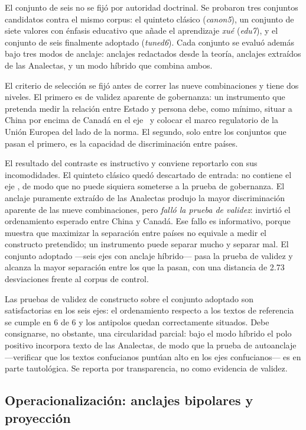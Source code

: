 El conjunto de seis no se fijó por autoridad doctrinal. Se probaron tres conjuntos candidatos contra el mismo corpus: el quinteto clásico  (\textit{canon5}), un conjunto de siete valores con énfasis educativo que añade el aprendizaje  \textit{xué} (\textit{edu7}), y el conjunto de seis finalmente adoptado (\textit{tuned6}). Cada conjunto se evaluó además bajo tres modos de anclaje: anclajes redactados desde la teoría, anclajes extraídos de las Analectas, y un modo híbrido que combina ambos.

El criterio de selección se fijó antes de correr las nueve combinaciones y tiene dos niveles. El primero es de validez aparente de gobernanza: un instrumento que pretenda medir la relación entre Estado y persona debe, como mínimo, situar a China por encima de Canadá en el eje \ejedf\ y colocar el marco regulatorio de la Unión Europea del lado de la norma. El segundo, solo entre los conjuntos que pasan el primero, es la capacidad de discriminación entre países.

El resultado del contraste es instructivo y conviene reportarlo con sus incomodidades. El quinteto clásico quedó descartado de entrada: no contiene el eje \ejedf, de modo que no puede siquiera someterse a la prueba de gobernanza. El anclaje puramente extraído de las Analectas produjo la mayor discriminación aparente de las nueve combinaciones, pero \emph{falló la prueba de validez}: invirtió el ordenamiento esperado entre China y Canadá. Ese fallo es informativo, porque muestra que maximizar la separación entre países no equivale a medir el constructo pretendido; un instrumento puede separar mucho y separar mal. El conjunto adoptado ---seis ejes con anclaje híbrido--- pasa la prueba de validez y alcanza la mayor separación entre los que la pasan, con una distancia de 2.73 desviaciones frente al corpus de control.

Las pruebas de validez de constructo sobre el conjunto adoptado son satisfactorias en los seis ejes: el ordenamiento respecto a los textos de referencia se cumple en 6 de 6 y los antipolos quedan correctamente situados. Debe consignarse, no obstante, una circularidad parcial: bajo el modo híbrido el polo positivo incorpora texto de las Analectas, de modo que la prueba de autoanclaje ---verificar que los textos confucianos puntúan alto en los ejes confucianos--- es en parte tautológica. Se reporta por transparencia, no como evidencia de validez.


\subsection{Operacionalización: anclajes bipolares y proyección}

